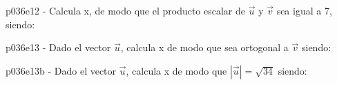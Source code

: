 \documentclass[spanish, 11pt]{exam}
\begin{document}
\begin{questions}
\begin{multicols}{2}
\begin{parts}
        \end{parts}
        \end{multicols}
        \question p036e12 - Calcula x, de modo que el producto escalar
de  $\overrightarrow{u}$ y $\overrightarrow{v}$ sea igual a 7, siendo: 
        \begin{multicols}{2} 
        \end{multicols}
        \question p036e13 - Dado el vector
$\overrightarrow{u}$, calcula x de modo que sea ortogonal a $\overrightarrow{v}$ siendo: 
        \begin{multicols}{2} 
        \end{multicols}
        \question p036e13b - Dado el vector
$\overrightarrow{u}$, calcula x de modo que $|\overrightarrow{u}|=\sqrt{34}$ siendo: 
        \begin{multicols}{2} 

\end{multicols}
\end{questions}
\end{document}
